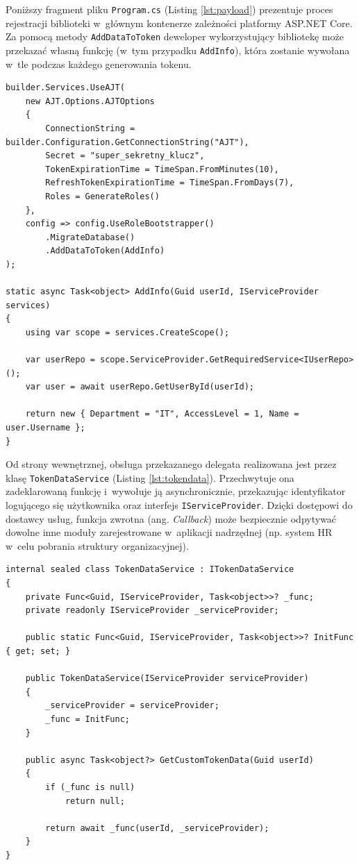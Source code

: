 \documentclass{SGGW-thesis}
\begin{document}
Poniższy fragment pliku \texttt{Program.cs} (Listing \ref{lst:payload}) prezentuje proces rejestracji biblioteki w~głównym kontenerze zależności platformy ASP.NET Core. Za pomocą metody \linebreak\texttt{AddDataToToken} deweloper wykorzystujący bibliotekę może przekazać własną funkcję (w~tym przypadku \texttt{AddInfo}), która zostanie wywołana w~tle podczas każdego generowania tokenu.

\begin{lstlisting}[caption={Wstrzykiwanie ładunku niestandardowego przez Fluent API}, label={lst:payload}]    
builder.Services.UseAJT(
    new AJT.Options.AJTOptions
    {
        ConnectionString = builder.Configuration.GetConnectionString("AJT"),
        Secret = "super_sekretny_klucz",
        TokenExpirationTime = TimeSpan.FromMinutes(10),
        RefreshTokenExpirationTime = TimeSpan.FromDays(7),
        Roles = GenerateRoles()
    },
    config => config.UseRoleBootstrapper()
        .MigrateDatabase()
        .AddDataToToken(AddInfo)
);

static async Task<object> AddInfo(Guid userId, IServiceProvider services)
{
    using var scope = services.CreateScope();

    var userRepo = scope.ServiceProvider.GetRequiredService<IUserRepo>();
    var user = await userRepo.GetUserById(userId);

    return new { Department = "IT", AccessLevel = 1, Name = user.Username };
}
\end{lstlisting}

\clearpage
Od strony wewnętrznej, obsługa przekazanego delegata realizowana jest przez klasę \linebreak\texttt{TokenDataService} (Listing \ref{lst:tokendata}). Przechwytuje ona zadeklarowaną funkcję i~wywołuje ją asynchronicznie, przekazując identyfikator logującego się użytkownika oraz interfejs \linebreak\texttt{IServiceProvider}. Dzięki dostępowi do dostawcy usług, funkcja zwrotna (ang. \textit{Callback}) może bezpiecznie odpytywać dowolne inne moduły zarejestrowane w~aplikacji nadrzędnej (np. system HR w~celu pobrania struktury organizacyjnej).

\begin{lstlisting}[caption={Odbiór i wykonanie delegata z zewnętrznym serwisem w tle}, label={lst:tokendata}]
internal sealed class TokenDataService : ITokenDataService
{
    private Func<Guid, IServiceProvider, Task<object>>? _func;
    private readonly IServiceProvider _serviceProvider;

    public static Func<Guid, IServiceProvider, Task<object>>? InitFunc { get; set; }

    public TokenDataService(IServiceProvider serviceProvider)
    {
        _serviceProvider = serviceProvider;
        _func = InitFunc;
    }

    public async Task<object?> GetCustomTokenData(Guid userId)
    {
        if (_func is null)
            return null;

        return await _func(userId, _serviceProvider);
    }
}
\end{lstlisting}
\end{document}

